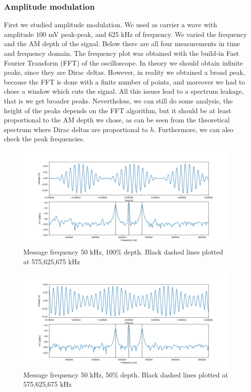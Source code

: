\documentclass[a4paper,10pt]{article}
\begin{document}
\subsubsection{Amplitude modulation}
First we studied amplitude modulation. We used as carrier a wave with amplitude $100$ mV peak-peak, and 625 kHz of frequency. We varied the frequency and the AM depth of the signal. Below  there are all four measurements in time and frequency domain. The frequency plot was obtained with the build-in Fast Fourier Transform (FFT) of the oscilloscope. In theory we should obtain infinite peaks, since they are Dirac deltas. However, in reality we obtained a broad peak, because the FFT is done with a finite number of points, and moreover we had to chose a window which cuts the signal. All this issues lead to a spectrum leakage, that is we get broader peaks. Nevertheless, we can still do some analysis, the height of the peaks depends on the FFT algorithm, but it should be at least proportional to the AM depth we chose, as can be seen from the theoretical spectrum where Dirac deltas are proportional to $h$. Furthermore, we can also check the peak frequencies.
\begin{figure}[H]
\centering
\includegraphics[width=\textwidth]{amp1}
\caption{Message frequency 50 kHz, 100\% depth. Black dashed lines plotted at 575,625,675 kHz}\label{1}
\end{figure}
\begin{figure}[H]
\centering
\includegraphics[width=\textwidth]{amp2}
\caption{Message frequency 50 kHz, 50\% depth. Black dashed lines plotted at 575,625,675 kHz}\label{2}
\end{figure}
\end{document}
